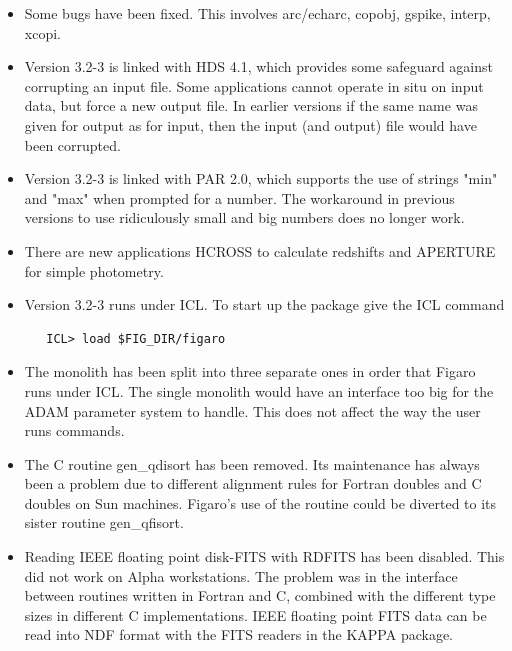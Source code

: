 \documentclass[11pt,twoside]{article}
\begin{document}
\begin{itemize}
\item
   Some bugs have been fixed. This involves arc/echarc, copobj, gspike,
   interp, xcopi.

\item
   Version 3.2-3 is linked with HDS 4.1, which provides some safeguard
   against corrupting an input file. Some applications cannot operate in
   situ on input data, but force a new output file. In earlier versions
   if the same name was given for output as for input, then the input
   (and output) file would have been corrupted.

\item
   Version 3.2-3 is linked with PAR 2.0, which supports the use of
   strings "min" and "max" when prompted for a number. The workaround in
   previous versions to use ridiculously small and big numbers does no
   longer work.

\item
   There are new applications HCROSS to calculate redshifts and APERTURE
   for simple photometry.

\item
   Version 3.2-3 runs under ICL. To start up the package give the ICL
   command

\begin{verbatim}
   ICL> load $FIG_DIR/figaro
\end{verbatim}

\item
   The monolith has been split into three separate ones in order that
   Figaro runs under ICL. The single monolith would have an interface
   too big for the ADAM parameter system to handle. This does not affect
   the way the user runs commands.

\item
   The C routine gen\_qdisort has been removed. Its maintenance has
   always been a problem due to different alignment rules for Fortran
   doubles and C doubles on Sun machines. Figaro's use of the routine
   could be diverted to its sister routine gen\_qfisort.

\item
   Reading IEEE floating point disk-FITS with RDFITS has been disabled.
   This did not work on Alpha workstations. The problem was in the
   interface between routines written in Fortran and C, combined with
   the different type sizes in different C implementations. IEEE
   floating point FITS data can be read into NDF format with the FITS
   readers in the KAPPA package.


\end{itemize}
\end{document}
